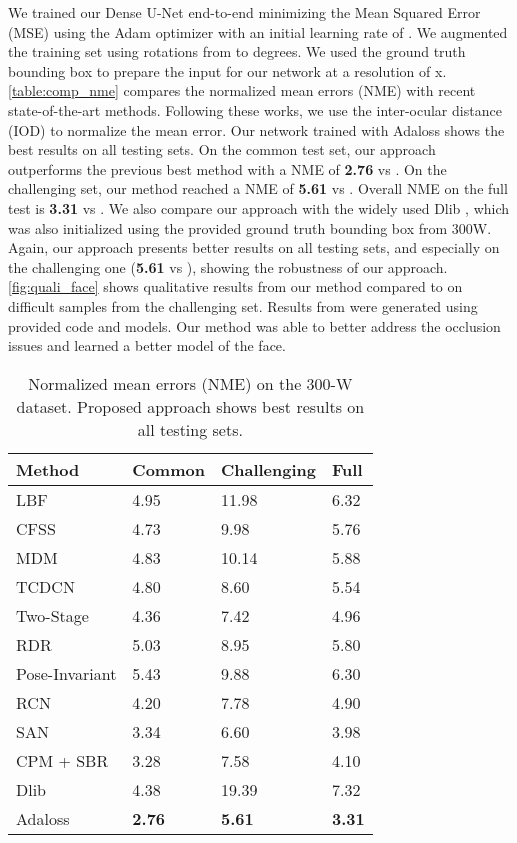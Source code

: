 \documentclass[10pt,twocolumn,letterpaper]{article}
\begin{document}
We trained our Dense U-Net end-to-end minimizing the Mean Squared Error
(MSE) using the Adam optimizer \cite{kingma2015} with an initial learning
rate of . We augmented the training set using rotations from
 to  degrees. We used the ground truth bounding box to prepare
the input for our network at a resolution of x. \autoref{table:comp_nme} compares the
normalized mean errors (NME) with recent state-of-the-art methods.
Following these works, we use the inter-ocular distance (IOD) to normalize
the mean error. Our network trained with Adaloss shows the best results
on all testing sets. On the common test set, our approach outperforms
the previous best method with a NME of \textbf{2.76} vs .
On the challenging set, our method reached a NME of \textbf{5.61} vs
. Overall NME on the full test is \textbf{3.31} vs .
We also compare our approach with the widely used Dlib \cite{dlib},
which was also initialized using the provided ground truth bounding box
from 300W. Again, our approach presents better results on all testing
sets, and especially on the challenging one (\textbf{5.61} vs
), showing the robustness of our approach.
\autoref{fig:quali_face} shows qualitative results from our
method compared to \cite{san} on difficult samples from the challenging
set. Results from \cite{san} were generated using provided code
and models. Our method was able to better address the occlusion
issues and learned a better model of the face.


\begin{table}[h]
  \centering
  \begin{tabular}{|l|l|l|l|}
    \hline
    Method & Common & Challenging & Full \\
    \hline
    LBF \cite{LBF} & 4.95 & 11.98 & 6.32 \\
    CFSS \cite{CFSS} & 4.73 & 9.98 & 5.76 \\
    MDM \cite{MDM} & 4.83 & 10.14 & 5.88 \\
    TCDCN \cite{TCDCN} & 4.80 & 8.60 & 5.54 \\
    Two-Stage \cite{twostage} & 4.36 & 7.42 & 4.96 \\
    RDR \cite{RDR} & 5.03 & 8.95 & 5.80 \\
    Pose-Invariant \cite{poseinvar} & 5.43 & 9.88 & 6.30 \\
    RCN \cite{honari2018} & 4.20 & 7.78 & 4.90 \\
    SAN \cite{san} & 3.34 & 6.60 & 3.98 \\
    CPM + SBR \cite{sbr} & 3.28 & 7.58 & 4.10 \\
    \hline
    Dlib \cite{dlib} & 4.38 & 19.39 & 7.32 \\
    \hline
    Adaloss & \textbf{2.76} & \textbf{5.61} & \textbf{3.31} \\
    \hline
  \end{tabular}
  \caption{Normalized mean errors (NME) on the 300-W dataset.
    Proposed approach shows best results on all testing sets.}
  \label{table:comp_nme}
\end{table}
\end{document}
